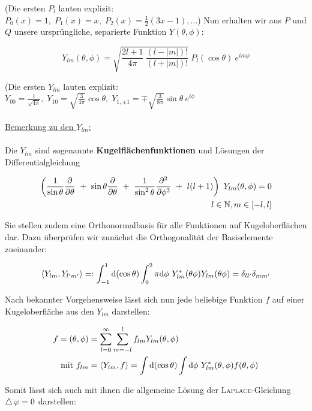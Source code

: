 (Die ersten $P_l$ lauten explizit: $P_0(x) =1, \; P_1(x) = x, \; P_2(x) = \frac{1}{2}(3x-1), \dotsc$)
Nun erhalten wir aus $P$ und $Q$ unsere ursprüngliche, separierte Funktion $Y(\theta,\phi)$:

\begin{equation*}
Y_{lm}(\theta,\phi) = \sqrt{\frac{2l + 1}{4\pi} \ \frac{(l-|m|)!}{(l+|m|)!}} \ P_l(\cos\theta) \ e^{im\phi}
\end{equation*}

(Die ersten $Y_{lm}$ lauten explizit: $Y_{00} = \frac{1}{\sqrt{4\pi}}, \; Y_{10} = \sqrt{\frac{3}{4\pi}}\cos\theta, \; Y_{1,\pm1} = \mp \sqrt{\frac{3}{8\pi}}\sin\theta \ e^{i\phi}$\
\\
\ \\
\underline{Bemerkung zu den $Y_{lm}$:}\
\\
\ \\
Die $Y_{lm}$ sind sogenannte \textbf{Kugelflächenfunktionen} und Lösungen der Differentialgleichung

\begin{align*}
\left(\frac{1}{\sin\theta}\pdiff{}{\theta} \ + \ \sin\theta \pdiff{}{\theta} \ + \ \frac{1}{\sin^2\theta} \pddiff{}{\phi} \ + \ l(l+1)\right) \ Y_{lm}(\theta,\phi) = 0\\
l \in \mathbb{N}, m \in [-l,l]
\end{align*}

Sie stellen zudem eine Orthonormalbasis für alle Funktionen auf Kugeloberflächen dar. Dazu überprüfen wir zunächst die Orthogonalität der Basiselemente zueinander:

\begin{equation*}
\langle Y_{lm},Y_{l'm'}\rangle =: \int_{-1}^1\mathrm{d}(\cos\theta)\int_{0}^2\pi\mathrm{d}\phi \ Y^{*}_{lm}(\theta\phi) Y_{lm}(\theta\phi) = \delta_{ll'}\delta_{mm'}
\end{equation*}

Nach bekannter Vorgehensweise lässt sich nun jede beliebige Funktion $f$ auf einer Kugeloberfläche aus den $Y_{lm}$ darstellen:

\begin{align*}
f = (\theta,\phi) &= \sum_{l=0}^{\infty} \sum_{m=-l}^{l} f_{lm} Y_{lm}(\theta,\phi)\\
\text{mit } f_{lm} &= \langle Y_{lm},f\rangle = \int\mathrm{d}(\cos\theta) \int\mathrm{d}\phi \ Y^{*}_{lm}(\theta,\phi)f(\theta,\phi)
\end{align*}

Somit lässt sich auch mit ihnen die allgemeine Lösung der \textsc{Laplace}-Gleichung $\mathop{{}\bigtriangleup}\nolimits\varphi=0$ darstellen: 


